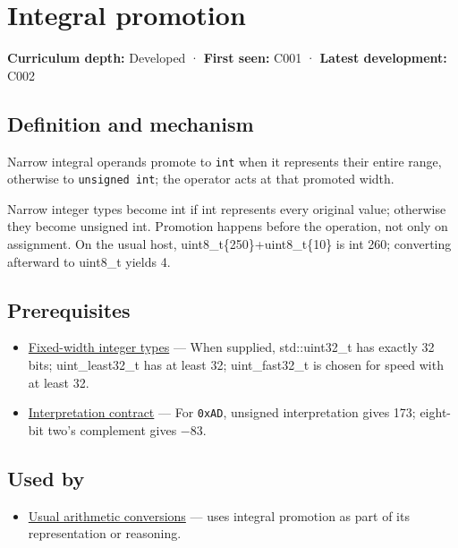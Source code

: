 \hypertarget{appendix-45303d03796a}{}\label{referencestart:appendix-45303d03796a}
\section{Integral promotion}\label{appendix-45303d03796a-integral-promotion}

\textbf{Curriculum depth:} Developed · \textbf{First seen:} C001 · \textbf{Latest development:} C002

\subsection{Definition and mechanism}\label{appendix-45303d03796a-definition-and-mechanism}

Narrow integral operands promote to \texttt{int} when it represents their entire range, otherwise to \texttt{unsigned\ int}; the operator acts at that promoted width.

Narrow integer types become int if int represents every original value; otherwise they become unsigned int. Promotion happens before the operation, not only on assignment. On the usual host, uint8\_t\{250\}+uint8\_t\{10\} is int 260; converting afterward to uint8\_t yields 4.

\subsection{Prerequisites}\label{appendix-45303d03796a-prerequisites}

\begin{itemize}
\tightlist
\item
  \hyperref[appendix-cc04044b5782]{Fixed-width integer types} --- When supplied, std::uint32\_t has exactly 32 bits; uint\_least32\_t has at least 32; uint\_fast32\_t is chosen for speed with at least 32.
\item
  \hyperref[appendix-f414bd4ed05c]{Interpretation contract} --- For \texttt{0xAD}, unsigned interpretation gives 173; eight-bit two's complement gives −83.
\end{itemize}

\subsection{Used by}\label{appendix-45303d03796a-used-by}

\begin{itemize}
\tightlist
\item
  \hyperref[appendix-5e2d663adf7f]{Usual arithmetic conversions} --- uses integral promotion as part of its representation or reasoning.
\end{itemize}

